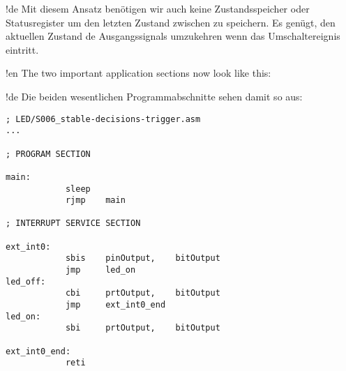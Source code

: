 !de Mit diesem Ansatz benötigen wir auch keine Zustandsspeicher oder Statusregister um den letzten Zustand zwischen zu speichern. Es genügt, den aktuellen Zustand de Ausgangssignals umzukehren wenn das Umschaltereignis eintritt.



!en The two important application sections now look like this:

!de Die beiden wesentlichen Programmabschnitte sehen damit so aus:

\begin{lstlisting}
; LED/S006_stable-decisions-trigger.asm
...

; PROGRAM SECTION

main:
            sleep
            rjmp    main

; INTERRUPT SERVICE SECTION

ext_int0:
            sbis    pinOutput,    bitOutput
            jmp     led_on
led_off:
            cbi     prtOutput,    bitOutput
            jmp     ext_int0_end
led_on:
            sbi     prtOutput,    bitOutput

ext_int0_end:
            reti
\end{lstlisting}

